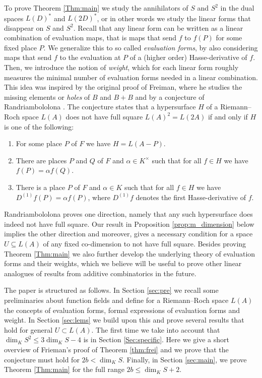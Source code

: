 \documentclass[12pt]{amsart}
\renewcommand{\leq}{\leqslant}
\theoremstyle{definition}
\begin{document}
	To prove Theorem \ref{Thm:main} we study the annihilators of $S$ and $S^2$ in the dual spaces $L(D)^\ast$ and $L(2D)^\ast$, or in other words we study the linear forms that disappear on $S$ and $S^2$. Recall that any linear form can be written as a linear combination of evaluation maps, that is maps that send $f$ to $f(P)$ for some fixed place $P$. We generalize this to so called \textit{evaluation forms}, by also considering maps that send $f$ to the evaluation at $P$ of a (higher order) Hasse-derivative of $f$. Then, we introduce the notion of \textit{weight}, which for each linear form roughly measures the minimal number of evaluation forms needed in a linear combination. This idea was inspired by the original proof of Freiman, where he studies the missing elements or \textit{holes} of $B$ and $B+B$ and by a conjecture of Randriambololona \cite[Subsection 8.3]{ran20quadhull}. The conjecture states that a hypersurface $H$ of a Riemann--Roch space $L(A)$ does not have full square $L(A)^2 = L(2A)$ if and only if $H$ is one of the following:
	\begin{enumerate}[\normalfont (i)]
		\item For some place $P$ of $F$ we have $H = L(A-P)$. 
		\item There are places $P$ and $Q$ of $F$ and $\alpha \in K^\times$ such that for all $f \in H$ we have $f(P) = \alpha f(Q)$. 
		\item There is a place $P$ of $F$ and $\alpha \in K$ such that for all $f \in H$ we have $D^{(1)}f(P) = \alpha f(P)$, where $D^{(1)}f$ denotes the first Hasse-derivative of $f$. 
	\end{enumerate}
	Randriambololona proves one direction, namely that any such hypersurface does indeed not have full square. Our result in Proposition \ref{prop:m_dimension} below implies the other direction and moreover, gives a necessary condition for a space $U \subseteq L(A)$ of any fixed co-dimension to not have full square. Besides proving Theorem \ref{Thm:main} we also further develop the underlying theory of evaluation forms and their weights, which we believe will be useful to prove other linear analogues of results from additive combinatorics in the future.
	
	The paper is structured as follows. In Section \ref{sec:pre} we recall some preliminaries about function fields and define for a Riemann--Roch space $L(A)$ the concepts of evaluation forms, formal expressions of evaluation forms and weight. In Section \ref{sec:lems} we build upon this and prove several results that hold for general $U \subset L(A)$. The first time we take into account that $\dim_K S^2 \leq 3\dim_K S - 4$ is in Section \ref{Sec:specific}. Here we give a short overview of Frieman's proof of Theorem \ref{thm:frei} and we prove that the conjecture must hold for $2b < \dim_K S$. Finally, in Section \ref{sec:main}, we prove Theorem \ref{Thm:main} for the full range $2b \leq \dim_K S + 2$.
	
\end{document}
